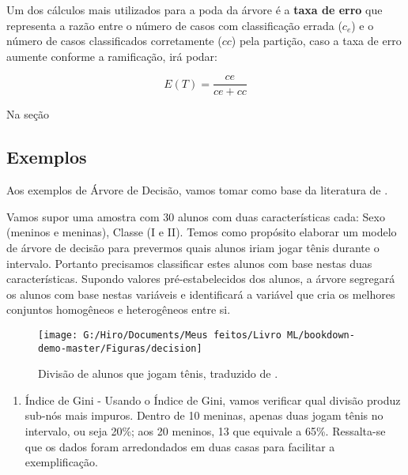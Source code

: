 \documentclass[
]{book}
\providecommand{\tightlist}{%
  \setlength{\itemsep}{0pt}\setlength{\parskip}{0pt}}
\begin{document}
Um dos cálculos mais utilizados para a poda da árvore é a \textbf{taxa de erro} que representa a razão entre o número de casos com classificação errada (\(c_e\)) e o número de casos classificados corretamente (\(cc\)) pela partição, caso a taxa de erro aumente conforme a ramificação, irá podar:

\begin{equation}
E(T)=\frac{ce}{ce+cc}
\label{eq:txerro}
\end{equation}

Na seção

\hypertarget{extree}{%
\subsection{Exemplos}\label{extree}}

Aos exemplos de Árvore de Decisão, vamos tomar como base da literatura de \citep{analytics}.

Vamos supor uma amostra com 30 alunos com duas características cada: Sexo (meninos e meninas), Classe (I e II). Temos como propósito elaborar um modelo de árvore de decisão para prevermos quais alunos iriam jogar tênis durante o intervalo. Portanto precisamos classificar estes alunos com base nestas duas características. Supondo valores pré-estabelecidos dos alunos, a árvore segregará os alunos com base nestas variáveis e identificará a variável que cria os melhores conjuntos homogêneos e heterogêneos entre si.

\begin{figure}

{\centering \texttt{[image: G:/Hiro/Documents/Meus feitos/Livro ML/bookdown-demo-master/Figuras/decision]} 

}

\caption{Divisão de alunos que jogam tênis, traduzido de \citep{analytics}.}\label{fig:decision}
\end{figure}



\begin{enumerate}
\def\labelenumi{\arabic{enumi}.}
\tightlist
\item
  Índice de Gini - Usando o Índice de Gini, vamos verificar qual divisão produz sub-nós mais impuros. Dentro de 10 meninas, apenas duas jogam tênis no intervalo, ou seja 20\%; aos 20 meninos, 13 que equivale a 65\%. Ressalta-se que os dados foram arredondados em duas casas para facilitar a exemplificação.
\end{enumerate}
\end{document}
